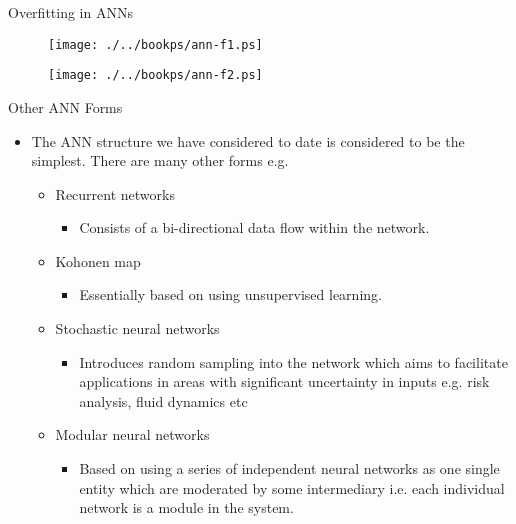 \documentclass[%
pdf,
colorBG,
slideColor,
tcrico,
]{prosper}
\begin{document}
\begin{slide}{  Overfitting in ANNs  } 
\begin{figure}
	\centering
	\texttt{[image: ./../bookps/ann-f1.ps]}
\end{figure}
\begin{figure}
	\centering
	\texttt{[image: ./../bookps/ann-f2.ps]}
\end{figure}

\end{slide}


\begin{slide}{ Other ANN Forms} 
\tiny
\begin{itemize}
 \item The ANN structure we have considered to date is considered to be the simplest. There are many other forms e.g. 
	\begin{itemize}
 	\item Recurrent networks
		\begin{itemize}
	 	\item Consists of a bi-directional data flow within the network. 
		\end{itemize}
	\item Kohonen map
		\begin{itemize}
		\item Essentially based on using unsupervised learning. 
		\end{itemize}
	\item Stochastic neural networks
		\begin{itemize}
		\item Introduces random sampling into the network which aims to facilitate applications in areas with significant uncertainty in inputs e.g. risk analysis, fluid dynamics etc
		\end{itemize}
	\item Modular neural networks
		\begin{itemize}
		\item Based on using a series of independent neural networks as one single entity which are moderated by some intermediary i.e. each individual network is a module in the system.
		\end{itemize}
	\end{itemize}
\end{itemize}
\end{slide}
\end{document}
